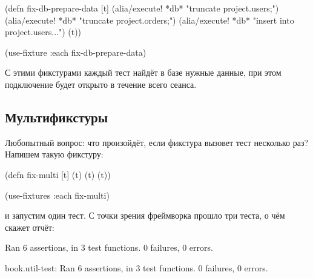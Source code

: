 \else

\begin{english}
  \begin{clojure}
(defn fix-db-prepare-data [t]
  (alia/execute! *db* "truncate project.users;")
  (alia/execute! *db* "truncate project.orders;")
  (alia/execute! *db* "insert into project.users...")
  (t))

(use-fixture :each fix-db-prepare-data)
  \end{clojure}
\end{english}

\fi

С этими фикстурами каждый тест найдёт в базе нужные данные, при этом подключение
будет открыто в течение всего сеанса.

\subsection{Мультификстуры}

\label{multi-fixture}


Любопытный вопрос: что произойдёт, если фикстура вызовет тест несколько раз?
Напишем такую фикстуру:

\begin{english}
  \begin{clojure}
(defn fix-multi [t]
  (t) (t) (t))

(use-fixtures :each fix-multi)
  \end{clojure}
\end{english}

\noindent
и запустим один тест. С точки зрения фреймворка прошло три теста, о чём скажет
отчёт:

\ifnarrow

\begin{english}
  \begin{text}
Ran 6 assertions, in 3 test functions.
0 failures, 0 errors.
  \end{text}
\end{english}

\else

\begin{english}
  \begin{text}
book.util-test: Ran 6 assertions, in 3 test functions.
0 failures, 0 errors.
  \end{text}
\end{english}

\fi

